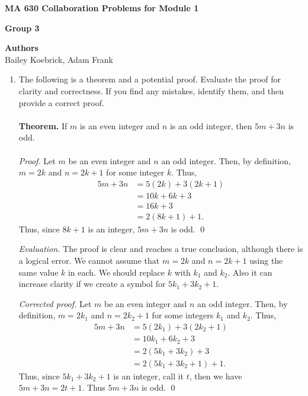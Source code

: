 \documentclass[12pt]{article}
\begin{document}
\pagestyle{empty}



\begin{center} \textbf{\large MA 630 Collaboration Problems for Module 1} 

\vspace{.15in}
\textbf{\large Group 3}

\vspace{.25in}

\textbf{Authors} %
\\Bailey Koebrick, Adam Frank

\end{center}

\begin{enumerate}
\item The following is a theorem and a potential proof. Evaluate the proof for clarity and correctness. If you find any mistakes, identify them, and then provide a correct proof.\\\\
\textbf{Theorem.} If $m$ is an even integer and $n$ is an odd integer, then $5m + 3n$ is odd.\\\\
\emph{Proof.} Let $m$ be an even integer and $n$ an odd integer. Then, by definition, $m = 2k$ and $n = 2k + 1$ for some integer $k$. Thus,
\begin{align*}
5m + 3n & = 5 (2k) + 3 (2k + 1)\\
& = 10 k + 6k + 3\\
& = 16 k + 3\\
& = 2(8 k + 1) + 1.
\end{align*}
Thus, since $8k + 1$ is an integer, $5m + 3n$ is odd. \qed


{\it Evaluation.}  The proof is clear and reaches a true conclusion, although there is a logical error.  We cannot assume that $m=2k$ and $n=2k+1$ using the same value $k$ in each.  We should replace $k$ with $k_1$ and $k_2$.  Also it can increase clarity if we create a symbol for $5k_1+3k_2+1$.

{\it Corrected proof.}  Let $m$ be an even integer and $n$ an odd integer. Then, by definition, $m = 2k_1$ and $n = 2k_2 + 1$ for some integers $k_1$ and $k_2$. Thus,
\begin{align*}
5m + 3n & = 5 (2k_1) + 3 (2k_2 + 1)\\
& = 10 k_1 + 6k_2 + 3\\
& = 2(5k_1+3k_2) + 3\\
& = 2(5k_1+3k_2+1) + 1.
\end{align*}
Thus, since $5k_1+3k_2+1$ is an integer, call it $t$, then we have $5m+3n = 2t+1$.  Thus $5m + 3n$ is odd. \qed


\end{enumerate}
\end{document}
